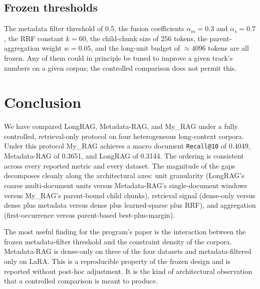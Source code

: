 \documentclass[11pt,a4paper]{article}
\begin{document}
\subsection{Frozen thresholds}
The metadata filter threshold of \num{0.5}, the fusion coefficients
$\alpha_m=0.3$ and $\alpha_s=0.7$, the RRF constant $k=60$, the
child-chunk size of \num{256} tokens, the parent-aggregation weight
$w=0.05$, and the long-unit budget of $\approx\num{4096}$ tokens are
all frozen. Any of them could in principle be tuned to improve a
given track's numbers on a given corpus; the controlled comparison
does not permit this.

\section{Conclusion}

We have compared LongRAG, Metadata-RAG, and My\_RAG under a fully
controlled, retrieval-only protocol on four heterogeneous
long-context corpora. Under this protocol My\_RAG achieves a macro
document \texttt{Recall@10} of \num{0.4049}, Metadata-RAG of
\num{0.3651}, and LongRAG of \num{0.3144}. The ordering is
consistent across every reported metric and every dataset. The
magnitude of the gaps decomposes cleanly along the architectural
axes: unit granularity (LongRAG's coarse multi-document units versus
Metadata-RAG's single-document windows versus My\_RAG's parent-bound
child chunks), retrieval signal (dense-only versus dense plus
metadata versus dense plus learned-sparse plus RRF), and aggregation
(first-occurrence versus parent-based best-plus-margin).

The most useful finding for the program's paper is the interaction
between the frozen metadata-filter threshold and the constraint
density of the corpora. Metadata-RAG is dense-only on three of the
four datasets and metadata-filtered only on LaRA. This is a
reproducible property of the frozen design and is reported without
post-hoc adjustment. It is the kind of architectural observation
that a controlled comparison is meant to produce.
\end{document}
